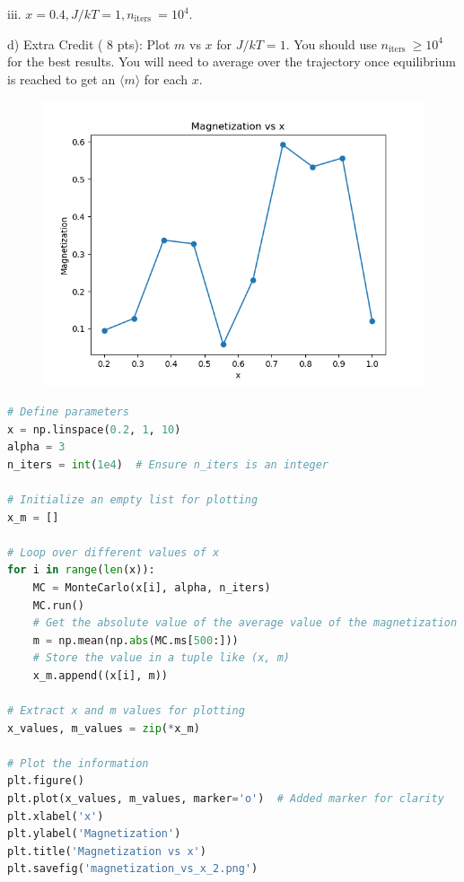 \documentclass[12pt]{article}
\begin{document}
iii. $x=0.4, J / k T=1, n_{\text {iters }}=10^{4}$.
\newpage

d) Extra Credit ( 8 pts): Plot $m$ vs $x$ for $J / k T=1$. You should use $n_{\text {iters }} \geq 10^{4}$ for the best results. You will need to average over the trajectory once equilibrium is reached to get an $\langle m\rangle$ for each $x$.

\begin{figure}
  \centering
  \includegraphics[max width=\textwidth]{magnetization_vs_x.png}
\end{figure}
\begin{lstlisting}[language=Python]
# Define parameters
x = np.linspace(0.2, 1, 10)
alpha = 3
n_iters = int(1e4)  # Ensure n_iters is an integer

# Initialize an empty list for plotting
x_m = []

# Loop over different values of x
for i in range(len(x)):
    MC = MonteCarlo(x[i], alpha, n_iters)
    MC.run()
    # Get the absolute value of the average value of the magnetization over the last 500 iterations
    m = np.mean(np.abs(MC.ms[500:]))
    # Store the value in a tuple like (x, m)
    x_m.append((x[i], m))

# Extract x and m values for plotting
x_values, m_values = zip(*x_m)

# Plot the information
plt.figure()
plt.plot(x_values, m_values, marker='o')  # Added marker for clarity
plt.xlabel('x')
plt.ylabel('Magnetization')
plt.title('Magnetization vs x')
plt.savefig('magnetization_vs_x_2.png')
\end{lstlisting}
\end{document}
